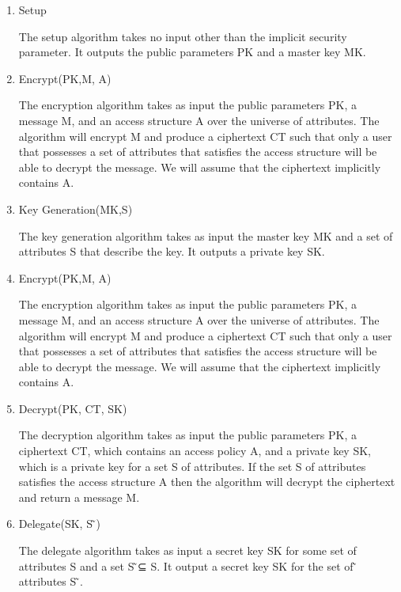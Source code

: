     \begin{enumerate}
    \item Setup\par
 The setup algorithm takes no input other than the implicit security parameter. It outputs the public parameters PK and a master key MK.
    \item Encrypt(PK,M, A)\par
   The encryption algorithm takes as input the public parameters PK, a message M, and an access structure A over the universe of attributes. The algorithm will encrypt M and produce a ciphertext CT such that only a user that possesses a set of attributes that satisfies the access structure will be able to decrypt the message. We will assume that the ciphertext implicitly contains A.
    \item Key Generation(MK,S)\par
   The key generation algorithm takes as input the master key MK and a set of attributes S that describe the key. It outputs a private key SK.
    \item Encrypt(PK,M, A) \par
   The encryption algorithm takes as input the public parameters PK, a message M, and an access structure A over the universe of attributes. The algorithm will encrypt M and produce a ciphertext CT such that only a user that possesses a set of attributes that satisfies the access structure will be able to decrypt the message. We will assume that the ciphertext implicitly contains A.
    \item Decrypt(PK, CT, SK) \par
  The decryption algorithm takes as input the public parameters PK, a ciphertext CT, which contains an access policy A, and a private key SK, which is a private key for a set S of attributes. If the set S of attributes satisfies the access structure A then the algorithm will decrypt the ciphertext and return a message M.
  \item Delegate(SK, S ̃) \par
 The delegate algorithm takes as input a secret key SK for some set of attributes S and a set S ̃⊆ S. It output a secret key SK for the set of  ̃ attributes S ̃.
\end{enumerate}





